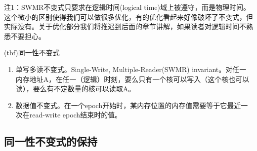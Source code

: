 \documentclass[UTF-8]{ctexrep}
\begin{document}
\par 注1：SWMR不变式只要求在逻辑时间(logical time)域上被遵守，而是物理时间。这个微小的区别使得我们可以做很多优化，有的优化看起来好像破坏了不变式，但实际没有。关于优化部分我们将推迟到后面的章节讲解，如果读者对逻辑时间不熟悉不要担心。
\par (tbf)同一性不变式
\begin{enumerate}
\item 单写多读不变式。Single-Write, Multiple-Reader(SWMR) invariant。对任一内存地址A，在任一（逻辑）时刻，要么只有一个核可以写入（这个核也可以读），要么有不定数量的核可以读取A。
\item 数据值不变式。在一个epoch开始时，某内存位置的内存值需要等于它最近一次在read-write epoch结束时的值。
\end{enumerate}
\subsection{同一性不变式的保持}

























\par















 
\end{document}
